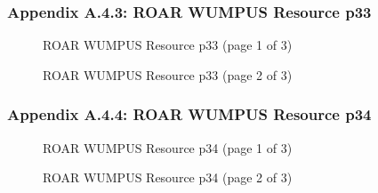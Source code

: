 \documentclass{article}[11pt]
\begin{document}
\subsubsection{Appendix A.4.3: ROAR WUMPUS Resource p33}
\begin{figure}[h]
\begin{center}
\end{center}
\caption{ROAR WUMPUS Resource p33 (page 1 of 3)}
\label{fig:roar-wumpus-resource-p33-page1}
\end{figure}
\newline
\begin{figure}[h]
\begin{center}
\end{center}
\caption{ROAR WUMPUS Resource p33 (page 2 of 3)}
\label{fig:roar-wumpus-resource-p33-page2}
\end{figure}
\newline
\newpage

\subsubsection{Appendix A.4.4: ROAR WUMPUS Resource p34}
\begin{figure}[h]
\begin{center}
\end{center}
\caption{ROAR WUMPUS Resource p34 (page 1 of 3)}
\label{fig:roar-wumpus-resource-p34-page1}
\end{figure}
\newline
\begin{figure}[h]
\begin{center}
\end{center}
\caption{ROAR WUMPUS Resource p34 (page 2 of 3)}
\label{fig:roar-wumpus-resource-p34-page2}
\end{figure}
\newline
\newpage
\end{document}
